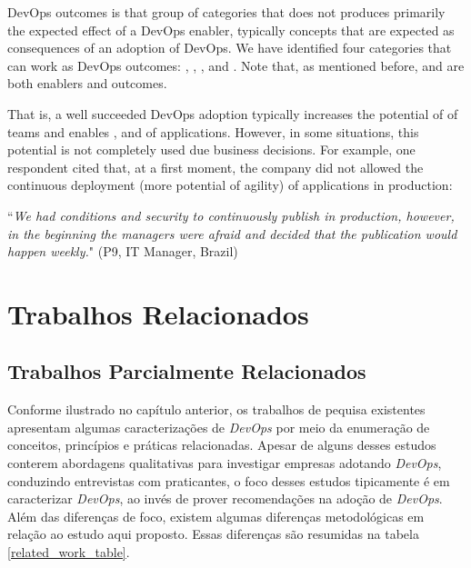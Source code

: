{%

DevOps outcomes is that group of categories that does not produces primarily the
expected effect of a DevOps enabler, typically concepts that are expected as
consequences of an adoption of DevOps. We have identified four categories that
can work as DevOps outcomes: , ,
, and . Note that,
as mentioned before,  and 
are both enablers and outcomes.

That is, a well succeeded DevOps adoption typically increases the potential of
 of teams and enables ,  and
 of applications.
However, in some situations, this potential is not completely used due business
decisions. For example, one respondent cited that, at a first moment, the
company did not allowed the continuous deployment (more potential of agility)
of applications in production:

\begin{mq}
``\emph{We had conditions and security to continuously publish in production,
however, in the beginning the managers were afraid and decided that the
publication would happen weekly.}" (P9, IT Manager, Brazil)
\end{mq}

\section{Trabalhos Relacionados}

\subsection{Trabalhos Parcialmente Relacionados}

Conforme ilustrado no capítulo anterior, os trabalhos de pequisa existentes
apresentam algumas caracterizações de \textit{DevOps} por meio da enumeração
de conceitos, princípios e práticas relacionadas. Apesar de alguns desses
estudos conterem abordagens qualitativas para investigar empresas adotando
\textit{DevOps}, conduzindo entrevistas com praticantes, o foco desses estudos
tipicamente é em caracterizar \textit{DevOps}, ao invés de prover recomendações
na adoção de \textit{DevOps}. Além das diferenças de foco, existem algumas
diferenças metodológicas em relação ao estudo aqui proposto. Essas diferenças
são resumidas na tabela \ref{related_work_table}.

}
